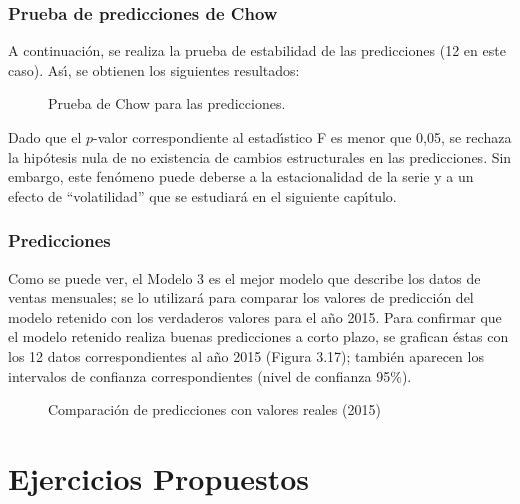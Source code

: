 \subsubsection*{Prueba de predicciones de Chow}

A continuaci\'{o}n, se realiza la prueba de estabilidad de las predicciones 
(12 en este caso). As\'{\i}, se obtienen los siguientes resultados:

\begin{figure}[H]
\centering
\caption{Prueba de Chow para las predicciones.}
\end{figure}

Dado que el $p$-valor correspondiente al estad\'{\i}stico F es menor que 
0,05, se rechaza la hip\'{o}tesis nula de no existencia de cambios 
estructurales en las predicciones. Sin embargo, este fen\'{o}meno puede 
deberse a la estacionalidad de la serie y a un efecto de ``volatilidad'' que 
se estudiar\'{a} en el siguiente cap\'{\i}tulo.

\subsubsection*{Predicciones}

Como se puede ver, el Modelo 3 es el mejor modelo que describe los datos de 
ventas mensuales; se lo utilizar\'{a} para comparar los valores de 
predicci\'{o}n del modelo retenido con los verdaderos valores para el 
a\~{n}o 2015. Para confirmar que el modelo retenido realiza buenas 
predicciones a corto plazo, se grafican \'{e}stas con los 12 datos 
correspondientes al a\~{n}o 2015 (Figura 3.17); tambi\'{e}n aparecen los 
intervalos de confianza correspondientes (nivel de confianza 95{\%}).

\begin{figure}[H]
\centering
\caption{Comparaci\'{o}n de predicciones con valores reales (2015)}
\end{figure}




\section{Ejercicios Propuestos}

